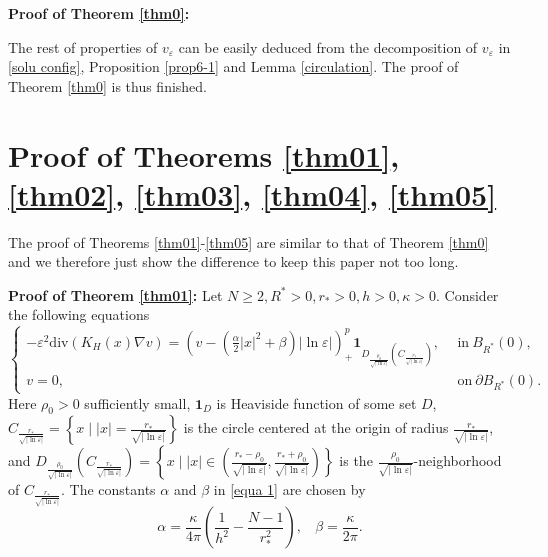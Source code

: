 \documentclass[12pt,reqno]{amsart}
\numberwithin{equation}{section}
\theoremstyle{definition}
\theoremstyle{remark}
\begin{document}
\textbf{Proof of Theorem \ref{thm0}:}

The rest of properties of $ v_\varepsilon $ can be easily deduced from the decomposition of $ v_\varepsilon $ in \eqref{solu config}, Proposition \ref{prop6-1} and Lemma \ref{circulation}. The proof of Theorem \ref{thm0} is thus finished.



	
	
	











\section{Proof of Theorems \ref{thm01}, \ref{thm02}, \ref{thm03}, \ref{thm04}, \ref{thm05}}

The proof of Theorems \ref{thm01}-\ref{thm05} are similar to that of Theorem \ref{thm0} and we therefore just show the difference to keep this paper not too long.

\textbf{Proof of Theorem \ref{thm01}:}
 Let $ N\geq 2, R^*>0, r_*>0, h>0, \kappa>0 $. Consider  the following equations
\begin{equation}\label{equa 1}
\begin{cases}
-\varepsilon^2\text{div}(K_H(x)\nabla v)=  \left (v-\left(\frac{\alpha}{2}|x|^2+\beta \right)|\ln\varepsilon| \right )^{p}_+\textbf{1}_{D_{\frac{\rho_0}{\sqrt{|\ln\varepsilon|}}}\left (C_{\frac{r_*}{\sqrt{|\ln\varepsilon|}}}\right )},\ \ &\text{in}\  B_{R^*}(0),\\
v=0,\ \ &\text{on}\ \partial B_{R^*}(0).
\end{cases}
\end{equation}
Here  $ \rho_0>0 $ sufficiently small, $ \textbf{1}_{D} $ is Heaviside function of some set $ D $, $ C_{\frac{r_*}{\sqrt{|\ln\varepsilon|}}}=\left \{x\mid |x|=\frac{r_*}{\sqrt{|\ln\varepsilon|}}\right \} $ is the circle centered at the origin of radius $ \frac{r_*}{\sqrt{|\ln\varepsilon|}} $, and $ D_{\frac{\rho_0}{\sqrt{|\ln\varepsilon|}}}\left (C_{\frac{r_*}{\sqrt{|\ln\varepsilon|}}}\right )=\left \{x\mid |x|\in \left (\frac{r_*-\rho_0}{\sqrt{|\ln\varepsilon|}},\frac{r_*+\rho_0}{\sqrt{|\ln\varepsilon|}} \right )\right \} $ is the $ \frac{\rho_0}{\sqrt{|\ln\varepsilon|}} $-neighborhood of $ C_{\frac{r_*}{\sqrt{|\ln\varepsilon|}}} $.  The constants $ \alpha $ and $ \beta $ in \eqref{equa 1} are chosen by
\begin{equation*} 
\alpha=\frac{\kappa}{4\pi}\left( \frac{1}{h^2}-\frac{N-1}{r_*^2}\right),\ \ \ \ \beta=\frac{\kappa}{2\pi}.
\end{equation*}
\end{document}

